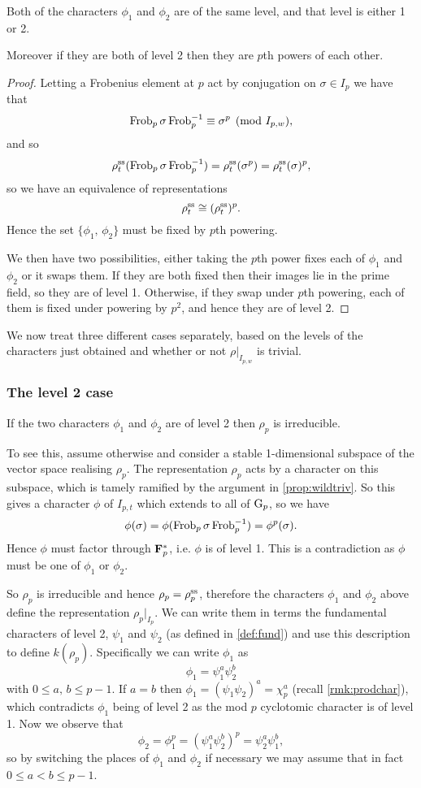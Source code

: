 \documentclass[a4paper,12pt]{article}
\begin{document}
\begin{prop}
Both of the characters $\phi_1$ and $\phi_2$ are of the same level, and that level is either 1 or 2.

Moreover if they are both of level 2 then they are $p$th powers of each other.
\end{prop}
\begin{proof}
Letting a Frobenius element at $p$ act by conjugation on $\sigma\in I_{p}$ we have that \cite[p. 167]{RibetStein}
\[
\operatorname{Frob}_p \sigma \operatorname{Frob}_p^{-1} \equiv \sigma^p \pmod{I_{p,w}},
\]
and so
\[
\rho^\text{ss}_t( \operatorname{Frob}_p\sigma \operatorname{Frob}_p^{-1}) = \rho^\text{ss}_t(\sigma^p) = \rho^\text{ss}_t(\sigma)^p,
\]
so we have an equivalence of representations
\[
\rho^\text{ss}_t \cong (\rho^\text{ss}_t)^p.
\]
Hence the set $\{\phi_1,\,\phi_2\}$ must be fixed by $p$th powering.

We then have two possibilities, either taking the $p$th power fixes each of $\phi_1$ and $\phi_2$ or it swaps them.
If they are both fixed then their images lie in the prime field, so they are of level 1.
Otherwise, if they swap under $p$th powering, each of them is fixed under powering by $p^2$, and hence they are of level 2.
\end{proof}

We now treat three different cases separately, based on the levels of the characters just obtained and whether or not $\rho|_{I_{p,w}}$ is trivial.


\subsubsection{The level 2 case}\label{sec:l2}
If the two characters $\phi_1$ and $\phi_2$ are of level 2 then $\rho_p$ is irreducible.

To see this, assume otherwise and consider a stable 1-dimensional subspace of the vector space realising $\rho_p$.
The representation $\rho_p$ acts by a character on this subspace, which is tamely ramified by the argument in \cref{prop:wildtriv}.
So this gives a character $\phi$ of $I_{p,t}$ which extends to all of $\mathrm{G}_p$, so we have
\[
\phi(\sigma) = \phi(\operatorname{Frob}_p\sigma\operatorname{Frob}_p^{-1}) = \phi^p(\sigma).
\]
Hence $\phi$ must factor through $\mathbf{F}_p^*$, i.e. $\phi$ is of level 1.
This is a contradiction as $\phi$ must be one of $\phi_1$ or $\phi_2$.

So $\rho_p$ is irreducible and hence $\rho_p = \rho^\text{ss}_p$, therefore the characters $\phi_1$ and $\phi_2$ above define the representation $\rho_p|_{I_{p}}$.
We can write them in terms the fundamental characters of level 2, $\psi_1$ and $\psi_2$ (as defined in \cref{def:fund}) and use this description to define $k(\rho_p)$.
Specifically we can write $\phi_1$ as
\[
\phi_1 = \psi_1^a\psi_2^b
\]
with $0\le a,\,b\le p-1$.
If $a = b$ then $\phi_1 = (\psi_1 \psi_2)^a=\chi_p^a$ (recall \cref{rmk:prodchar}), which contradicts $\phi_1$ being of level 2 as the mod $p$ cyclotomic character is of level 1.
Now we observe that
\[
\phi_2 = \phi_1^p = (\psi_1^a\psi_2^b)^p = \psi_2^a\psi_1^b,
\]
so by switching the places of $\phi_1$ and $\phi_2$ if necessary we may assume that in fact $0\le a < b\le p-1$.
\end{document}
